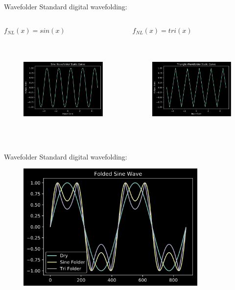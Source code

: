 \begin{frame}{Wavefolder}
    Standard digital wavefolding:
    \vspace{2ex}
    \begin{columns}
        \begin{column}{0.5\linewidth}
            $f_{NL}(x) = sin(x)$
            \vspace{-3ex}
            \begin{figure}
                \includegraphics[height=2in]{../Wavefolder/Pics/sine_static}
            \end{figure}
        \end{column}
        \begin{column}{0.5\linewidth}
            $f_{NL}(x) = tri(x)$
            \vspace{-3ex}
            \begin{figure}
                \includegraphics[height=2in]{../Wavefolder/Pics/tri_static}
            \end{figure}
        \end{column}
    \end{columns}
\end{frame}

\begin{frame}{Wavefolder}
    Standard digital wavefolding:
    \begin{figure}
        \centering
        \includegraphics[height=2.5in]{../Wavefolder/Pics/simple_fold}
    \end{figure}
\end{frame}


